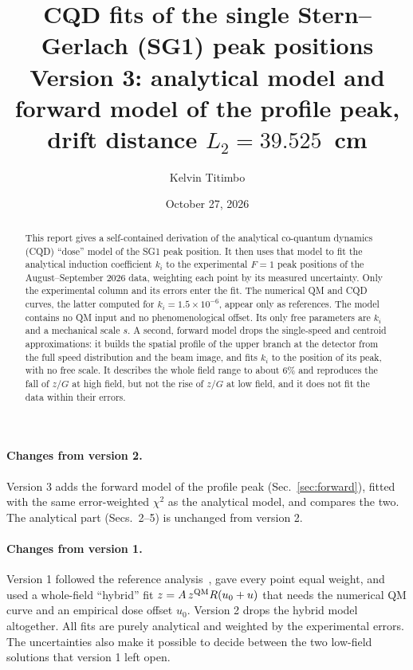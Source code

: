 \documentclass[11pt,a4paper]{article}
\title{CQD fits of the single Stern--Gerlach (SG1) peak positions\\[4pt]
\large Version 3: analytical model and forward model of the profile peak,\\ drift distance $L_2 = 39.525$~cm}
\author{Kelvin Titimbo}
\date{October 27, 2026}
\newcommand{\kan}{k_i}
\begin{document}
\maketitle

\begin{abstract}
\noindent This report gives a self-contained derivation of the analytical co-quantum dynamics (CQD) ``dose'' model of the SG1 peak position. It then uses that model to fit the analytical induction coefficient $\kan$ to the experimental $F=1$ peak positions of the August--September 2026 data, weighting each point by its measured uncertainty. Only the experimental column and its errors enter the fit. The numerical QM and CQD curves, the latter computed for $k_i = 1.5\times10^{-6}$, appear only as references. The model contains no QM input and no phenomenological offset. Its only free parameters are $\kan$ and a mechanical scale $s$.
A second, forward model drops the single-speed and centroid approximations: it builds the spatial profile of the upper branch at the detector from the full speed distribution and the beam image, and fits $\kan$ to the position of its peak, with no free scale. It describes the whole field range to about 6\% and reproduces the fall of $z/G$ at high field, but not the rise of $z/G$ at low field, and it does not fit the data within their errors.
\end{abstract}

\paragraph{Changes from version 2.} Version 3 adds the forward model of the profile peak (Sec.~\ref{sec:forward}), fitted with the same error-weighted $\chi^2$ as the analytical model, and compares the two. The analytical part (Secs.~2--5) is unchanged from version 2.

\paragraph{Changes from version 1.} Version 1 followed the reference analysis~\cite{wang2026}, gave every point equal weight, and used a whole-field ``hybrid'' fit $z = A\,z^{\rm QM} R(u_0+u)$ that needs the numerical QM curve and an empirical dose offset $u_0$. Version 2 drops the hybrid model altogether. All fits are purely analytical and weighted by the experimental errors. The uncertainties also make it possible to decide between the two low-field solutions that version 1 left open.
\end{document}
